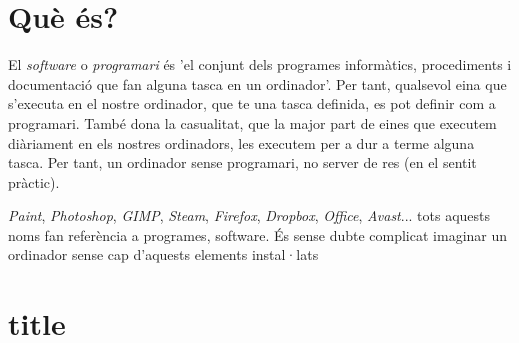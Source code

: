 \section{Què és?}
El \emph{software} o \emph{programari} és 'el conjunt dels programes informàtics, procediments i documentació que fan alguna tasca en un ordinador'. Per tant, qualsevol eina que s'executa en el nostre ordinador, que te una tasca definida, es pot definir com a programari. També dona la casualitat, que la major part de eines que executem diàriament en els nostres ordinadors, les executem per a dur a terme alguna tasca. Per tant, un ordinador sense programari, no server de res (en el sentit pràctic).

\emph{Paint}, \emph{Photoshop}, \emph{GIMP}, \emph{Steam}, \emph{Firefox}, \emph{Dropbox}, \emph{Office}, \emph{Avast}... tots aquests noms fan referència a programes, software. És 
sense dubte complicat imaginar un ordinador sense cap d'aquests elements instal·lats

\section{title}
